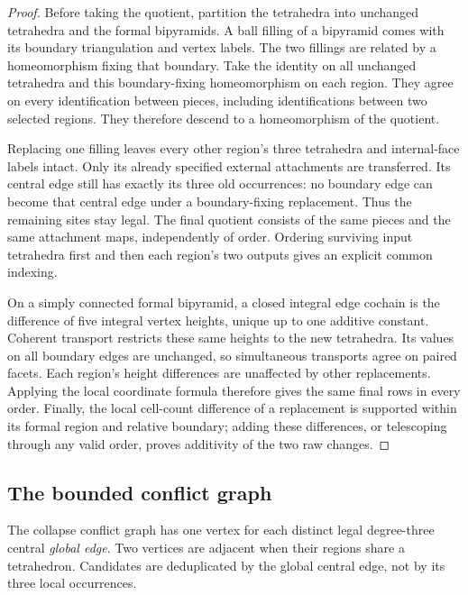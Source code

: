 \begin{proof}
Before taking the quotient, partition the tetrahedra into unchanged
tetrahedra and the formal bipyramids. A ball filling of a bipyramid
comes with its boundary triangulation and vertex labels. The two
fillings are related by a homeomorphism fixing that boundary. Take the
identity on all unchanged tetrahedra and this boundary-fixing
homeomorphism on each region. They agree on every identification
between pieces, including identifications between two selected regions.
They therefore descend to a homeomorphism of the quotient.

Replacing one filling leaves every other region's three tetrahedra and
internal-face labels intact. Only its already specified external
attachments are transferred. Its central edge still has exactly its
three old occurrences: no boundary edge can become that central edge
under a boundary-fixing replacement. Thus the remaining sites stay legal.
The final quotient consists of the same pieces and the same attachment
maps, independently of order. Ordering surviving input tetrahedra first
and then each region's two outputs gives an explicit common indexing.

On a simply connected formal bipyramid, a closed integral edge cochain
is the difference of five integral vertex heights, unique up to one
additive constant. Coherent transport restricts these same heights to
the new tetrahedra. Its values on all boundary edges are unchanged,
so simultaneous transports agree on paired facets. Each region's
height differences are unaffected by other replacements. Applying the
local coordinate formula therefore gives the same final rows in every
order. Finally, the local cell-count difference of a replacement is
supported within its formal region and relative boundary; adding these
differences, or telescoping through any valid order, proves additivity
of the two raw changes.
\end{proof}

\subsection{The bounded conflict graph}

\begin{definition}
The collapse conflict graph has one vertex for each distinct legal
degree-three central \emph{global edge}. Two vertices are adjacent when
their regions share a tetrahedron. Candidates are deduplicated by the
global central edge, not by its three local occurrences.
\end{definition}

